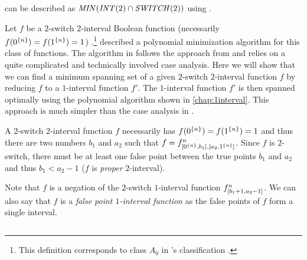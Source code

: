 can be described as
$\mathit{MIN} (\mathit{INT} (2) \cap \mathit{SWITCH} (2))$
using
.

Let $f$ be a $2$-switch $2$-interval Boolean function
(necessarily $f(0^{\{n\}}) = f(1^{\{n\}})
= 1$)
.\footnote{This definition corresponds to class $A_0$
in \citeauthor{Dubovsky2012}'s classification
\citep[p.~5]{Dubovsky2012}.}
\citeauthor{Dubovsky2012} described a polynomial minimization algorithm for this class of functions.
The algorithm in \citet[p.~17]{Dubovsky2012}
follows the approach from \citet{Schieber2005154}
and relies on a quite complicated and technically involved case analysis.
Here we will show that we can find a minimum spanning set of a given $2$-switch $2$-interval function $f$ by reducing $f$ to a $1$-interval function $f'$.
The $1$-interval function $f'$ is then spanned optimally
using the polynomial algorithm
shown in \cref{chap:1interval}.
This approach is much simpler
than the case analysis in \citet{Dubovsky2012}.

A $2$-switch $2$-interval function $f$ necessarily has $f(0^{\{n\}})=f(1^{\{n\}})=1$
and thus there are two numbers $b_1$ and $a_2$
such that $f = f^{n}_{[0^{\{n\}}, b_1], [a_2, 1^{\{n\}}]}$.
Since $f$ is $2$-switch,
there must be at least one false point
between the true points $b_1$ and $a_2$
and thus $b_1 < a_2-1$
($f$ is \emph{proper} $2$-interval).

Note that $f$ is a negation
of the $2$-switch $1$-interval
function $f^n_{[b_1 + 1, a_2 - 1]}$.
We can also say that $f$ is a \emph{false point $1$-interval function}
as the false points of $f$ form a single interval.

\subsection{\algdesctitle}

